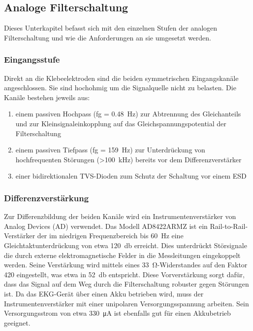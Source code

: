 
\subsection{Analoge Filterschaltung}

Dieses Unterkapitel befasst sich mit den einzelnen Stufen der analogen Filterschaltung und wie die Anforderungen an sie umgesetzt werden.

\subsubsection{Eingangsstufe}

Direkt an die Klebeelektroden sind die beiden symmetrischen Eingangskanäle angeschlossen. Sie sind hochohmig um die Signalquelle nicht zu belasten. Die Kanäle bestehen jeweils aus:

\begin{enumerate}

\item einem passiven Hochpass (fg = \SI{0,48}{\hertz}) zur Abtrennung des Gleichanteils und zur Kleinsignaleinkopplung auf das Gleichspannungspotential der Filterschaltung

\item einem passiven Tiefpass (fg = \SI{159}{\hertz}) zur Unterdrückung von hochfrequenten Störungen (>\SI{100}{\kilo\hertz}) bereits vor dem Differenzverstärker

\item einer bidirektionalen TVS-Dioden zum Schutz der Schaltung vor einem ESD

\end{enumerate}

\subsubsection{Differenzverstärkung}

Zur Differenzbildung der beiden Kanäle wird ein Instrumentenverstärker von Analog Devices (AD) verwendet. Das Modell AD8422ARMZ ist ein Rail-to-Rail-Verstärker der im niedrigen Frequenzbereich bis \SI{60}{\hertz} eine Gleichtaktunterdrückung von etwa \SI{120}{\decibel} erreicht. Dies unterdrückt Störsignale die durch externe elektromagnetische Felder in die Messleitungen eingekoppelt werden. Seine Verstärkung wird mittels eines \SI{33}{\ohm}-Widerstandes auf den Faktor 420 eingestellt, was etwa in \SI{52}{\decibel} entspricht. Diese Vorverstärkung sorgt dafür, dass das Signal auf dem Weg durch die Filterschaltung robuster gegen Störungen ist. Da das EKG-Gerät über einen Akku betrieben wird, muss der Instrumentenverstärker mit einer unipolaren Versorgungsspannung arbeiten. Sein Versorgungsstrom von etwa \SI{330}{\micro\ampere} ist ebenfalls gut für einen Akkubetrieb geeignet. %

